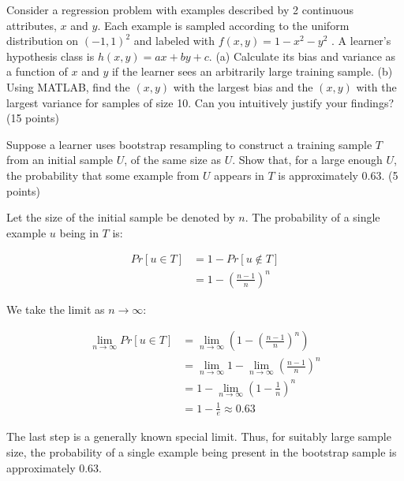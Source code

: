 \documentclass[fleqn]{homework}
\begin{document}
  \begin{problem}{3}
    \begin{question}
      Consider a regression problem with examples described by 2 continuous
      attributes, $x$ and $y$.  Each example is sampled according to the uniform
      distribution on $(-1,1)^2$ and labeled with $f(x,y)=1 - x^2 - y^2$ . A
      learner’s hypothesis class is $h(x,y)=ax+by+c$. (a) Calculate its bias and
      variance as a function of $x$ and $y$ if the learner sees an arbitrarily
      large training sample. (b) Using MATLAB, find the $(x,y)$ with the largest
      bias and the $(x,y)$ with the largest variance for samples of size 10. Can
      you intuitively justify your findings? (15 points)
    \end{question}
  \end{problem}

  \begin{problem}{4}
    \begin{question}
      Suppose a learner uses bootstrap resampling to construct a training sample
      $T$ from an initial sample $U$, of the same size as $U$. Show that, for a
      large enough $U$, the probability that some example from $U$ appears in
      $T$ is approximately 0.63. (5 points)
    \end{question}

    Let the size of the initial sample be denoted by $n$.  The probability of a
    single example $u$ being in $T$ is:

    \begin{align*}
      Pr[u \in T] &= 1 - Pr[u \not\in T] \\
      &= 1 - \left(\frac{n-1}{n}\right)^n
    \end{align*}

    We take the limit as $n\to\infty$:

    \begin{align*}
      \lim_{n\to\infty} Pr[u \in T]
      &= \lim_{n\to\infty} \left(1 - \left(\frac{n-1}{n}\right)^n\right) \\
      &= \lim_{n\to\infty} 1 -  \lim_{n\to\infty}\left(\frac{n-1}{n}\right)^n \\
      &= 1 - \lim_{n\to\infty}\left(1 - \frac{1}{n}\right)^n \\
      &= 1 - \frac{1}{e} \approx 0.63
    \end{align*}

    The last step is a generally known special limit.  Thus, for suitably large
    sample size, the probability of a single example being present in the
    bootstrap sample is approximately 0.63.
  \end{problem}
\end{document}
